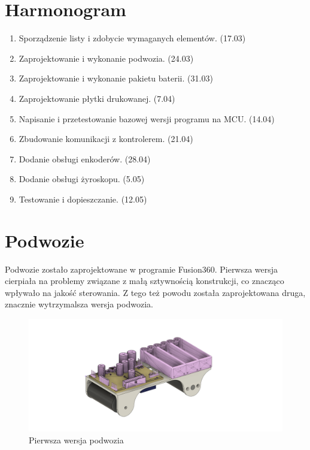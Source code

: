 \documentclass[10pt, a4paper]{article}
\begin{document}
\section{Harmonogram}
\begin{enumerate}
	\item Sporządzenie listy i zdobycie wymaganych elementów. (17.03)
	\item Zaprojektowanie i wykonanie podwozia. (24.03)
	\item Zaprojektowanie i wykonanie pakietu baterii. (31.03)
	\item Zaprojektowanie płytki drukowanej. (7.04)
	\item Napisanie i przetestowanie bazowej wersji programu na MCU. (14.04)
	\item Zbudowanie komunikacji z kontrolerem. (21.04)
	\item Dodanie obsługi enkoderów. (28.04)
	\item Dodanie obsługi żyroskopu. (5.05)
	\item Testowanie i dopieszczanie. (12.05)
\end{enumerate}


\section{Podwozie}
Podwozie zostało zaprojektowane w programie Fusion360. 
Pierwsza wersja cierpiała na problemy związane z małą sztywnością 
konstrukcji, co znacząco wpływało na jakość sterowania. 
Z tego też powodu została zaprojektowana druga, znacznie wytrzymalsza
wersja podwozia.

\begin{figure}[H]
	\centering
	\includegraphics[width=1\textwidth]{figures/chassisV1.png}
	\caption{Pierwsza wersja podwozia}
	\label{fig:chassisv1}
\end{figure}
\end{document}
